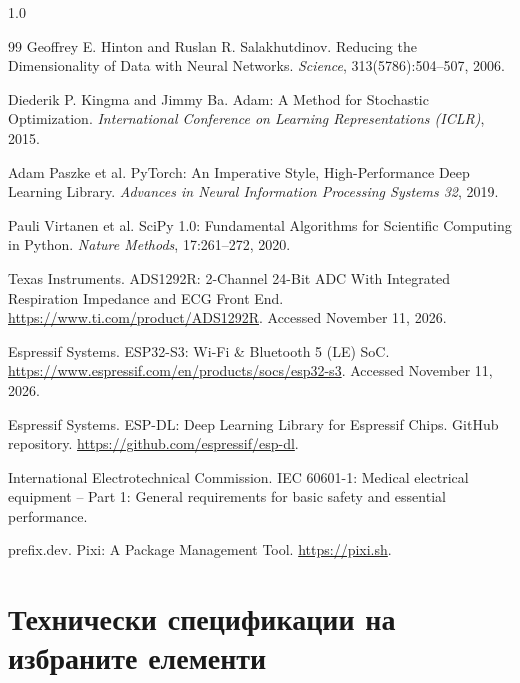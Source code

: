 \documentclass[12pt,a4paper]{article}
\begin{document}
\begin{spacing}{1.0}
\begin{thebibliography}{99}
Geoffrey E. Hinton and Ruslan R. Salakhutdinov.
\newblock Reducing the Dimensionality of Data with Neural Networks.
\newblock \textit{Science}, 313(5786):504--507, 2006.

Diederik P. Kingma and Jimmy Ba.
\newblock Adam: A Method for Stochastic Optimization.
\newblock \textit{International Conference on Learning Representations (ICLR)}, 2015.

Adam Paszke et al.
\newblock PyTorch: An Imperative Style, High-Performance Deep Learning Library.
\newblock \textit{Advances in Neural Information Processing Systems 32}, 2019.

Pauli Virtanen et al.
\newblock SciPy 1.0: Fundamental Algorithms for Scientific Computing in Python.
\newblock \textit{Nature Methods}, 17:261--272, 2020.

Texas Instruments.
\newblock ADS1292R: 2-Channel 24-Bit ADC With Integrated Respiration Impedance and ECG Front End.
\newblock \url{https://www.ti.com/product/ADS1292R}.
\newblock Accessed November 11, 2026.

Espressif Systems.
\newblock ESP32-S3: Wi-Fi \& Bluetooth 5 (LE) SoC.
\newblock \url{https://www.espressif.com/en/products/socs/esp32-s3}.
\newblock Accessed November 11, 2026.

Espressif Systems.
\newblock ESP-DL: Deep Learning Library for Espressif Chips.
\newblock GitHub repository.
\newblock \url{https://github.com/espressif/esp-dl}.

International Electrotechnical Commission.
\newblock IEC 60601-1: Medical electrical equipment -- Part 1: General requirements for basic safety and essential performance.

prefix.dev.
\newblock Pixi: A Package Management Tool.
\newblock \url{https://pixi.sh}.

\end{thebibliography}
\end{spacing}

\clearpage
\section*{Технически спецификации на избраните елементи}
\end{document}
